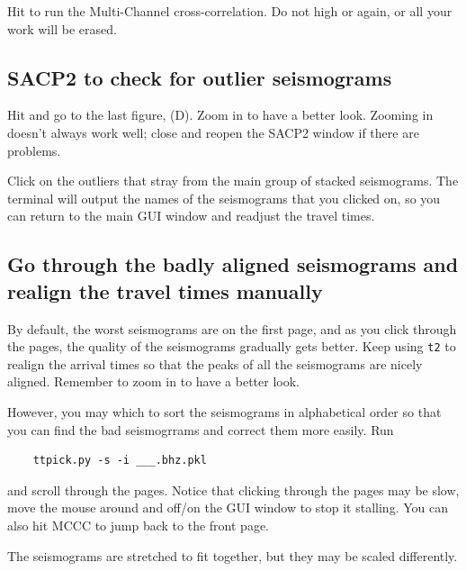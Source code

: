 \documentclass[letterpaper,10pt]{article}
\begin{document}
Hit  to run the Multi-Channel cross-correlation. Do not high  or  again, or all your work will be erased. 


\subsection{SACP2 to check for outlier seismograms}

Hit  and go to the last figure, (D). Zoom in to have a better look. Zooming in doesn't always work well; close and reopen the SACP2 window if there are problems. 

Click on the outliers that stray from the main group of stacked seismograms. The terminal will output the names of the seismograms that you clicked on, so you can return to the main GUI window and readjust the travel times.


\subsection{Go through the badly aligned seismograms and realign the travel times manually}

By default, the worst seismograms are on the first page, and as you click through the pages, the quality of the seismograms gradually gets better. Keep using \texttt{t2} to realign the arrival times so that the peaks of all the seismograms are nicely aligned. Remember to zoom in to have a better look.

However, you may which to sort the seismograms in alphabetical order so that you can find the bad seismogrrams and correct them more easily. Run 

\begin{verbatim}
	ttpick.py -s -i ___.bhz.pkl
\end{verbatim}

and scroll through the pages. Notice that clicking through the pages may be slow, move the mouse around and off/on the GUI window to stop it stalling. You can also hit MCCC to jump back to the front page. 

The seismograms are stretched to fit together, but they may be scaled differently. 

\end{document}
